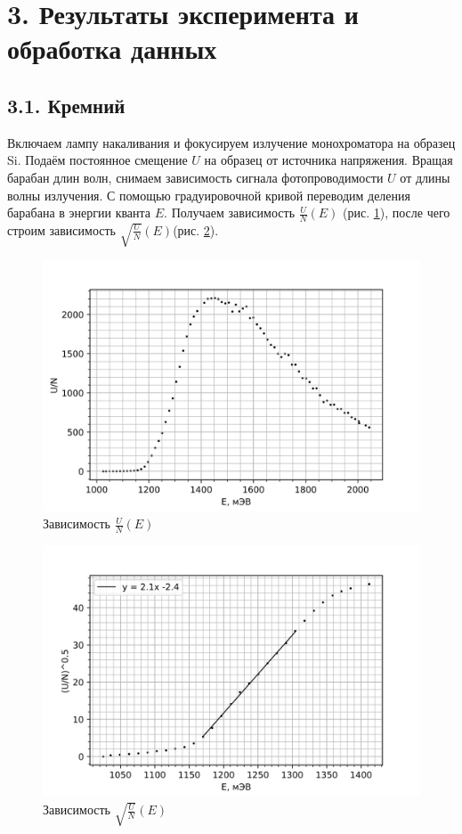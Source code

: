 \documentclass[a4paper,12pt]{report}
\begin{document}
\section*{3. Результаты эксперимента и обработка данных}

\subsection*{3.1. Кремний}
    Включаем лампу накаливания и фокусируем излучение монохроматора на образец Si. Подаём постоянное смещение $U$ на образец от источника напряжения. Вращая барабан длин волн, снимаем зависимость сигнала фотопроводимости $U$ от длины волны излучения. С помощью градуировочной кривой переводим деления барабана в энергии кванта $E$. Получаем зависимость $\frac{U}{N}(E)$ (рис. \ref{Si}), после чего строим зависимость $\sqrt{\frac{U}{N}}(E)$(рис. \ref{Si_add}).
    
    \begin{figure}[H]
        \centering
        \includegraphics[width=0.6\linewidth]{Si.png}
        \caption{Зависимость $\frac{U}{N}(E)$} \label{Si}
    \end{figure}
    
    \begin{figure}[H]
        \centering
        \includegraphics[width=0.6\linewidth]{Si_add.png}
        \caption{Зависимость $\sqrt{\frac{U}{N}}(E)$} \label{Si_add}
    \end{figure}
\end{document}
